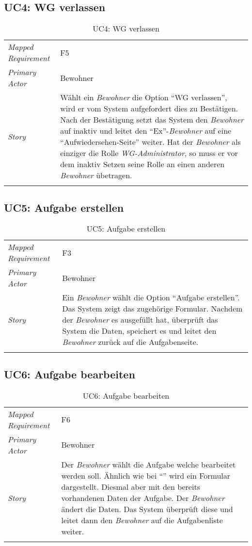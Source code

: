 \subsection{UC4: WG verlassen}\label{subsec:uc4}
\begin{table}[H]
	\tablestyle
	\tablealtcolored
	\begin{tabularx}{\textwidth}{lX}
		\tablebody
			\textit{Mapped Requirement} &
			F5
			\tabularnewline
			\textit{Primary Actor} &
			Bewohner
			\tabularnewline
			\textit{Story} &
			Wählt ein \emph{Bewohner} die Option ``WG verlassen'', wird er vom System aufgefordert dies zu Bestätigen. Nach der Bestätigung setzt das System den \emph{Bewohner} auf inaktiv und leitet den ``Ex''-\emph{Bewohner} auf eine ``Aufwiedersehen-Seite'' weiter. \newline
			Hat der \emph{Bewohner} als einziger die Rolle \emph{WG-Administrator}, so muss er vor dem inaktiv Setzen seine Rolle an einen anderen \emph{Bewohner} übetragen.
			\tabularnewline
		\tableend
	\end{tabularx}
	\caption{UC4: WG verlassen}
\end{table}


\subsection{UC5: Aufgabe erstellen}\label{subsec:uc5}
\begin{table}[H]
	\tablestyle
	\tablealtcolored
	\begin{tabularx}{\textwidth}{lX}
		\tablebody
			\textit{Mapped Requirement} &
			F3
			\tabularnewline
			\textit{Primary Actor} &
			Bewohner
			\tabularnewline
			\textit{Story} &
			Ein \emph{Bewohner} wählt die Option ``Aufgabe erstellen''. Das System zeigt das zugehörige Formular. Nachdem der \emph{Bewohner} es ausgefüllt hat, überprüft das System die Daten, speichert es und leitet den \emph{Bewohner} zurück auf die Aufgabenseite.
			\tabularnewline
		\tableend
	\end{tabularx}
	\caption{UC5: Aufgabe erstellen}
\end{table}


\subsection{UC6: Aufgabe bearbeiten}\label{subsec:uc6}
\begin{table}[H]
	\tablestyle
	\tablealtcolored
	\begin{tabularx}{\textwidth}{lX}
		\tablebody
			\textit{Mapped Requirement} &
			F6
			\tabularnewline
			\textit{Primary Actor} &
			Bewohner
			\tabularnewline
			\textit{Story} &
			Der \emph{Bewohner} wählt die Aufgabe welche bearbeitet werden soll. Ähnlich wie bei ``\nameref{subsec:uc5}'' wird ein Formular dargestellt. Diesmal aber mit den bereits vorhandenen Daten der Aufgabe. Der \emph{Bewohner} ändert die Daten. Das System überprüft diese und leitet dann den \emph{Bewohner} auf die Aufgabenliste weiter.
			\tabularnewline
		\tableend
	\end{tabularx}
	\caption{UC6: Aufgabe bearbeiten}
\end{table}


